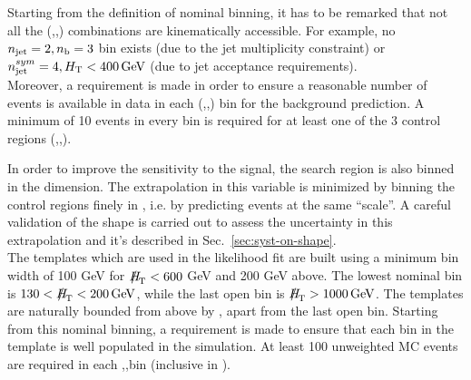 Starting from the definition of nominal binning, it has to be remarked that not all the (\njet,\nb,\scalht) combinations 
are kinematically accessible. For example, no $n_{\text{jet}}=2,n_{\text{b}}=3$ bin exists (due to the jet multiplicity constraint) 
or $n_{\text{jet}}^{sym}=4,\mbox{$H_\text{T}$}<400\,\mathrm{GeV}$ (due to jet acceptance requirements). \\
Moreover, a requirement is made in order to ensure a reasonable number of events is available in data 
in each (\njet,\nb,\scalht) bin for the background prediction. 
A minimum of 10 events in every bin is required for at least one of the 3 control regions (\mj,\mmj,\gj). 

In order to improve the sensitivity to the signal, the search region is also binned in the \MHT dimension. 
The extrapolation in this variable is minimized by binning the control regions finely in \scalht, i.e. by predicting 
events at the same ``scale''. A careful validation of the \MHT shape is carried out to assess 
the uncertainty in this extrapolation and it's described in Sec.~\ref{sec:syst-on-shape}. \\
The \MHT templates which are used in the likelihood fit are built using a minimum bin width of 
100 GeV for $\MHT<600$ GeV and 200 GeV above. The lowest nominal bin is $130<\MHT<200\,\mathrm{GeV}$, 
while the last open bin is $\MHT>1000\,\mathrm{GeV}$. 
The \MHT templates are naturally bounded from above by \scalht, apart from the last open \scalht bin. 
Starting from this nominal binning, a requirement is made to ensure that each bin in the template is well populated in the simulation. 
At least 100 unweighted MC events are required in each \njet,\scalht,\MHT bin (inclusive in \nb). \\

